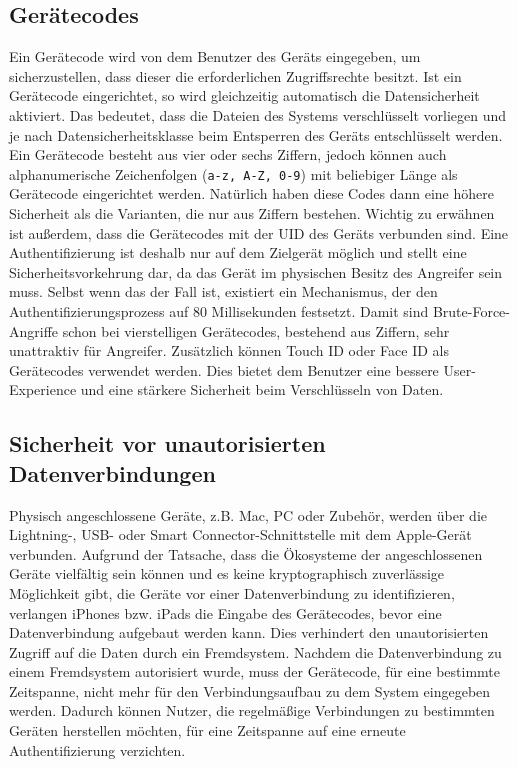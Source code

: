 \subsection{Gerätecodes}
Ein Gerätecode wird von dem Benutzer des Geräts eingegeben, um sicherzustellen,
dass dieser die erforderlichen Zugriffsrechte besitzt. Ist ein Gerätecode
eingerichtet, so wird gleichzeitig automatisch die Datensicherheit aktiviert.
Das bedeutet, dass die Dateien des Systems verschlüsselt vorliegen und je nach
Datensicherheitsklasse beim Entsperren des Geräts entschlüsselt werden. Ein
Gerätecode besteht aus vier oder sechs Ziffern, jedoch können auch
alphanumerische Zeichenfolgen (\texttt{a-z, A-Z, 0-9}) mit beliebiger Länge als
Gerätecode eingerichtet werden. Natürlich haben diese Codes dann eine höhere
Sicherheit als die Varianten, die nur aus Ziffern bestehen. Wichtig zu erwähnen
ist außerdem, dass die Gerätecodes mit der UID des Geräts verbunden sind. Eine
Authentifizierung ist deshalb nur auf dem Zielgerät möglich und stellt eine
Sicherheitsvorkehrung dar, da das Gerät im physischen Besitz des Angreifer sein
muss. Selbst wenn das der Fall ist, existiert ein Mechanismus, der den
Authentifizierungsprozess auf 80 Millisekunden festsetzt. Damit sind
Brute-Force-Angriffe schon bei vierstelligen Gerätecodes, bestehend aus Ziffern,
sehr unattraktiv für Angreifer. Zusätzlich können Touch ID oder Face ID als
Gerätecodes verwendet werden. Dies bietet dem Benutzer eine bessere
User-Experience und eine stärkere Sicherheit beim Verschlüsseln von Daten. \cite{apple2020}

\subsection{Sicherheit vor unautorisierten  Datenverbindungen}
Physisch angeschlossene Geräte,  z.B. Mac, PC oder Zubehör, werden über die Lightning-, USB- oder Smart 
Connector-Schnittstelle mit dem Apple-Gerät verbunden. Aufgrund der Tatsache, dass die Ökosysteme der
angeschlossenen Geräte vielfältig sein können und es keine kryptographisch zuverlässige Möglichkeit gibt,
die Geräte vor einer Datenverbindung zu identifizieren, verlangen iPhones bzw. iPads die Eingabe des Gerätecodes,
bevor eine Datenverbindung aufgebaut werden kann. \cite[S. 65]{apple2020} Dies verhindert den unautorisierten
Zugriff auf die Daten durch ein Fremdsystem. Nachdem die Datenverbindung zu einem Fremdsystem autorisiert wurde, 
muss der Gerätecode, für eine bestimmte Zeitspanne, nicht mehr für den Verbindungsaufbau zu dem System 
eingegeben werden. Dadurch können Nutzer, die regelmäßige Verbindungen zu bestimmten Geräten herstellen möchten,
für eine Zeitspanne auf eine erneute Authentifizierung verzichten. \cite{apple2020} \\

